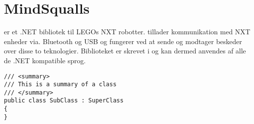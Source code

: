 \section{MindSqualls}
\mindsqualls er et .NET bibliotek til LEGOs NXT robotter.
\mindsqualls tillader kommunikation med NXT enheder via. Bluetooth og USB og fungerer ved at sende og modtager beskeder over disse to teknologier.
Biblioteket er skrevet i \csharp og kan dermed anvendes af alle de .NET kompatible sprog.

\begin{lstlisting}[style=csharp]
/// <summary>
/// This is a summary of a class
/// </summary>
public class SubClass : SuperClass
{
}
\end{lstlisting}
